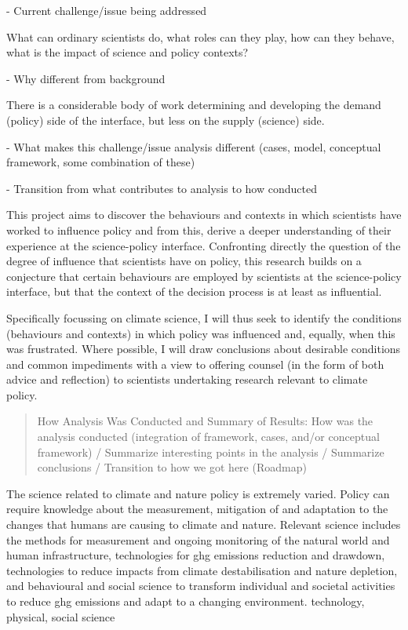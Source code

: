 - Current challenge/issue being addressed

What can ordinary scientists do, what roles can they play, how can they behave, what is the impact of science and policy contexts?

- Why different from background

There is a considerable body of work determining and developing the demand (policy) side of the interface, but less on the supply (science) side.

- What makes this challenge/issue analysis different (cases, model, conceptual framework, some combination of these)

- Transition from what contributes to analysis to how conducted

This project aims to discover the behaviours and contexts in which scientists have worked to influence policy and from this, derive a deeper understanding of their experience at the science-policy interface. Confronting directly the question of the degree of influence that scientists have on policy, this research builds on a conjecture that certain behaviours are employed by scientists at the science-policy interface, but that the context of the decision process is at least as influential. 

Specifically focussing on climate science, I will thus seek to identify the conditions (behaviours and contexts) in which policy was influenced and, equally, when this was frustrated. Where possible, I will draw conclusions about desirable conditions and common impediments with a view to offering counsel (in the form of both advice and reflection) to scientists undertaking research relevant to climate policy. 

\begin{quote}
How Analysis Was Conducted and Summary of Results: How was the analysis conducted (integration of framework, cases, and/or conceptual framework) / Summarize interesting points in the analysis / Summarize conclusions / Transition to how we got here (Roadmap)
\end{quote}

The science related to climate and nature policy is extremely varied. Policy can require knowledge about the measurement, mitigation of and adaptation to the changes that humans are causing to climate and nature. Relevant science includes the methods for measurement and ongoing monitoring of the natural world and human infrastructure, technologies for ghg emissions reduction and drawdown, technologies to reduce impacts from climate destabilisation and nature depletion, and behavioural and social science to transform individual and societal activities to reduce ghg emissions and adapt to a changing environment. technology, physical, social science

